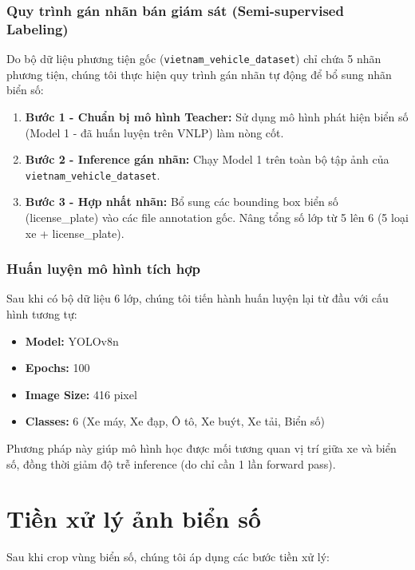 \subsubsection{Quy trình gán nhãn bán giám sát (Semi-supervised Labeling)}
Do bộ dữ liệu phương tiện gốc (\texttt{vietnam\_vehicle\_dataset}) chỉ chứa 5 nhãn phương tiện, chúng tôi thực hiện quy trình gán nhãn tự động để bổ sung nhãn biển số:

\begin{enumerate}
    \item \textbf{Bước 1 - Chuẩn bị mô hình Teacher:} Sử dụng mô hình phát hiện biển số (Model 1 - đã huấn luyện trên VNLP) làm nòng cốt.
    \item \textbf{Bước 2 - Inference gán nhãn:} Chạy Model 1 trên toàn bộ tập ảnh của \texttt{vietnam\_vehicle\_dataset}.
    \item \textbf{Bước 3 - Hợp nhất nhãn:} Bổ sung các bounding box biển số (license\_plate) vào các file annotation gốc. Nâng tổng số lớp từ 5 lên 6 (5 loại xe + license\_plate).
\end{enumerate}

\subsubsection{Huấn luyện mô hình tích hợp}
Sau khi có bộ dữ liệu 6 lớp, chúng tôi tiến hành huấn luyện lại từ đầu với cấu hình tương tự:
\begin{itemize}
    \item \textbf{Model:} YOLOv8n
    \item \textbf{Epochs:} 100
    \item \textbf{Image Size:} 416 pixel
    \item \textbf{Classes:} 6 (Xe máy, Xe đạp, Ô tô, Xe buýt, Xe tải, Biển số)
\end{itemize}

Phương pháp này giúp mô hình học được mối tương quan vị trí giữa xe và biển số, đồng thời giảm độ trễ inference (do chỉ cần 1 lần forward pass).

\section{Tiền xử lý ảnh biển số}

Sau khi crop vùng biển số, chúng tôi áp dụng các bước tiền xử lý:

